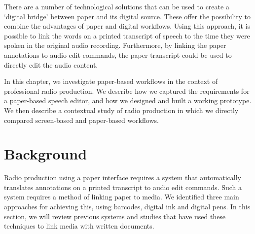 There are a number of technological solutions that can be used to create a `digital bridge' between paper and
its digital source. These offer the possibility to combine the advantages of paper and digital workflows. Using this
approach, it is possible to link the words on a printed transcript of speech to the time they were spoken in the
original audio recording. Furthermore, by linking the paper annotations to audio edit commands, the paper transcript
could be used to directly edit the audio content.

In this chapter, we investigate paper-based workflows in the context of professional radio production. We describe how
we captured the requirements for a paper-based speech editor, and how we designed and built a working prototype. We
then describe a contextual study of radio production in which we directly compared screen-based and paper-based
workflows. 

\section{Background}\label{sec:paper-background}
Radio production using a paper interface requires a system that automatically translates annotations on a printed
transcript to audio edit commands. Such a system requires a method of linking paper to media.  We identified three
main approaches for achieving this, using barcodes, digital ink and digital pens.  In this section, we will review
previous systems and studies that have used these techniques to link media with written documents.


